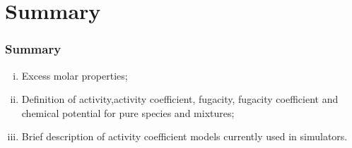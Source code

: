 \documentclass[10pt,compress,unknownkeysallowed]{beamer}
\begin{document}
\section{Summary}

\begin{frame}
 \frametitle{Summary}
   \begin{enumerate}[(i)]
      \item Excess molar properties;
      \item Definition of activity,activity coefficient, fugacity, fugacity coefficient and chemical potential for pure species and mixtures;
      \item Brief description of activity coefficient models currently used in simulators.
   \end{enumerate}
\end{frame}
\end{document}
